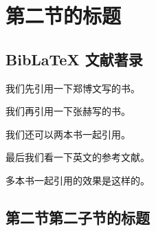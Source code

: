 
\section{第二节的标题}

\zhlipsum[1]

\subsection{BibLaTeX 文献著录}

我们先引用一下郑博文写的书\cite{rudin1976principleschinese3}。

我们再引用一下张赫写的书\cite{rudin1976principleschinese}。

我们还可以两本书一起引用\cite{rudin1976principleschinese,rudin1976principleschinese3}。

最后我们看一下英文的参考文献\cite{rudin1976principles}。

多本书一起引用的效果是这样的\cite{rudin1976principleschinese,rudin1976principleschinese3, rudin1976principles, rudin1976principleschinese2}。

\zhlipsum[1]

\subsection{第二节第二子节的标题}

\zhlipsum
